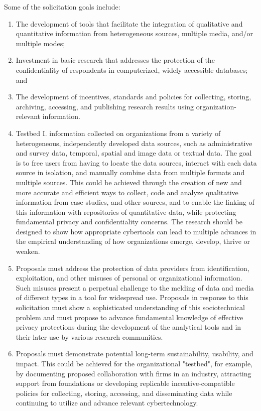 Some of the solicitation goals include:
\begin{enumerate}

\item The development of tools that facilitate the integration of
qualitative and quantitative information from heterogeneous sources,
multiple media, and/or multiple modes;

\item Investment in basic research that addresses the protection of the
confidentiality of respondents in computerized, widely accessible
databases; and

\item The development of incentives, standards and policies for collecting,
storing, archiving, accessing, and publishing research results using
organization-relevant information.

\item Testbed I. information collected on organizations from a variety of
heterogeneous, independently developed data sources, such as administrative
and survey data, temporal, spatial and image data or textual data. The goal
is to free users from having to locate the data sources, interact with each
data source in isolation, and manually combine data from multiple formats
and multiple sources. This could be achieved through the creation of new
and more accurate and efficient ways to collect, code and analyze
qualitative information from case studies, and other sources, and to enable
the linking of this information with repositories of quantitative data,
while protecting fundamental privacy and confidentiality concerns. The
research should be designed to show how appropriate cybertools can lead to
multiple advances in the empirical understanding of how organizations
emerge, develop, thrive or weaken.

\item Proposals must address the protection of data providers from
identification, exploitation, and other misuses of personal or
organizational information. Such misuses present a perpetual challenge to
the melding of data and media of different types in a tool for widespread
use. Proposals in response to this solicitation must show a sophisticated
understanding of this sociotechnical problem and must propose to advance
fundamental knowledge of effective privacy protections during the
development of the analytical tools and in their later use by various
research communities.

\item Proposals must demonstrate potential long-term sustainability,
usability, and impact. This could be achieved for the organizational
"testbed", for example, by documenting proposed collaboration with firms in
an industry, attracting support from foundations or developing replicable
incentive-compatible policies for collecting, storing, accessing, and
disseminating data while continuing to utilize and advance relevant
cybertechnology.


\end{enumerate}
